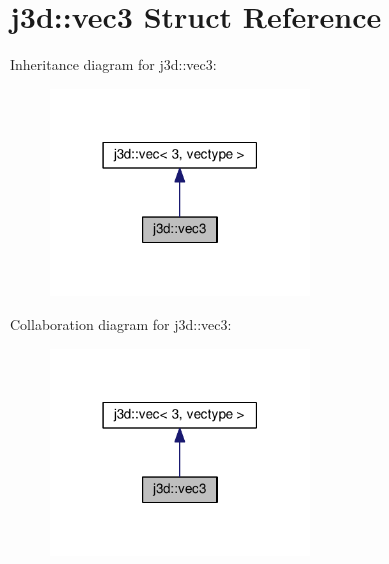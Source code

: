 \hypertarget{structj3d_1_1vec3}{}\section{j3d\+:\+:vec3 Struct Reference}
\label{structj3d_1_1vec3}


Inheritance diagram for j3d\+:\+:vec3\+:
\nopagebreak
\begin{figure}[H]
\begin{center}
\leavevmode
\includegraphics[width=195pt]{structj3d_1_1vec3__inherit__graph}
\end{center}
\end{figure}


Collaboration diagram for j3d\+:\+:vec3\+:
\nopagebreak
\begin{figure}[H]
\begin{center}
\leavevmode
\includegraphics[width=195pt]{structj3d_1_1vec3__coll__graph}
\end{center}
\end{figure}
